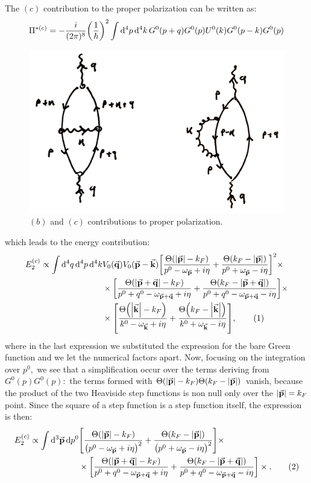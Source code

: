 \documentclass[a4paper]{article}
\newcommand{\numberthis}{\addtocounter{equation}{1}\tag{\theequation}}
\newcommand{\Ta}{\Theta\pqty{\abs{\va{p}+\va{q}}-k_F}}
\newcommand{\Taa}{\Theta\pqty{k_F - \abs{\va{p}+\va{q}}}}
\newcommand{\Td}{\Theta\pqty{\abs{\va{p}}-k_F}}
\newcommand{\Tdd}{\Theta\pqty{k_F -\abs{\va{p}}}}
\newcommand{\Tf}{\Theta\pqty{\abs{\va{k}}-k_F}}
\newcommand{\Tff}{\Theta\pqty{k_F -\abs{\va{k}}}}
\begin{document}
The $(c)$ contribution to the proper polarization can be written as:
\begin{equation}
\Pi^{*(c)} = -\frac{i}{(2\pi)^8}\pqty{\frac{1}{\hbar}}^2\int \dd[4]{p}\dd[4]{k}G^0(p+q)G^0(p)U^0(k)G^0(p-k)G^0(p)
\end{equation}
\begin{figure}[t]
\centering
\includegraphics[width=.55\textwidth]{b_c_diagram.png}
\caption{$(b)$ and $(c)$ contributions to proper polarization.}
\label{fig:b_diagram}
\end{figure}
which leads to the energy contribution:
\begin{align*}
E_2^{(c)} \propto \int \dd[4]{q}\dd[4]{p}\dd[4]{k}&V_0(\va{q}) V_0(\va{p} -\va{k})
\bqty{\frac{\Td}{p^0-\omega_{\va{p}} +i\eta}+ \frac{\Tdd}{p^0+\omega_{\va{p}} -i\eta}}^2 \times \\
&\times\bqty{\frac{\Ta}{p^0 +q^0 -\omega_{\va{p} + \va{q}} + i\eta} + \frac{\Taa}{p^0+q^0 -\omega_{\va{p}+\va{q}}-i\eta}}\times\\
&\times \bqty{\frac{\Tf}{k^0-\omega_{\va{k}} +i\eta}+ \frac{\Tff}{k^0+\omega_{\va{k}} -i\eta}},\numberthis \\\label{eq:c_con}
\end{align*}
where in the last expression we substituted the expression for the bare Green function and we let the numerical factors apart.
Now, focusing on the integration over $p^0,$ we see that a simplification occur over the terms deriving from $G^0(p)G^0(p):$ the terms formed with $\Td\Tdd$ vanish, because the product of the two Heaviside step functions is non null only over the $\abs{\va{p}} = k_F$ point.
Since the square of a step function is a step function itself, the expression is then:
\begin{align*}
E_2^{(c)} \propto \int \dd[3]{\va{p}}\dd{p^0}&
\bqty{\frac{\Td}{\pqty{p^0-\omega_{\va{p}} +i\eta}^2}+ \frac{\Tdd}{\pqty{p^0+\omega_{\va{p}} -i\eta}^2}} \times \\
&\times\bqty{\frac{\Ta}{p^0 +q^0 -\omega_{\va{p} + \va{q}} + i\eta} + \frac{\Taa}{p^0+q^0 -\omega_{\va{p}+\va{q}}-i\eta}}\times.\numberthis\\
\end{align*}
\end{document}
